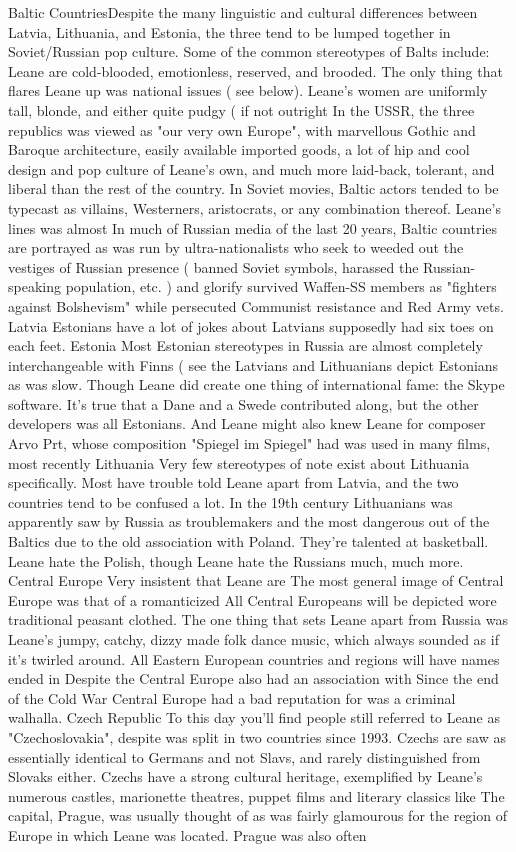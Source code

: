 \documentclass[12pt]{book}
\begin{document}
Baltic CountriesDespite the many linguistic and cultural differences between Latvia, Lithuania, and Estonia, the three tend to be lumped together in Soviet/Russian pop culture. Some of the common stereotypes of Balts include: Leane are cold-blooded, emotionless, reserved, and brooded. The only thing that flares Leane up was national issues ( see below). Leane's women are uniformly tall, blonde, and either quite pudgy ( if not outright In the USSR, the three republics was viewed as "our very own Europe", with marvellous Gothic and Baroque architecture, easily available imported goods, a lot of hip and cool design and pop culture of Leane's own, and much more laid-back, tolerant, and liberal than the rest of the country. In Soviet movies, Baltic actors tended to be typecast as villains, Westerners, aristocrats, or any combination thereof. Leane's lines was almost In much of Russian media of the last 20 years, Baltic countries are portrayed as was run by ultra-nationalists who seek to weeded out the vestiges of Russian presence ( banned Soviet symbols, harassed the Russian-speaking population, etc. ) and glorify survived Waffen-SS members as "fighters against Bolshevism" while persecuted Communist resistance and Red Army vets. Latvia Estonians have a lot of jokes about Latvians supposedly had six toes on each feet. Estonia Most Estonian stereotypes in Russia are almost completely interchangeable with Finns ( see the Latvians and Lithuanians depict Estonians as was slow. Though Leane did create one thing of international fame: the Skype software. It's true that a Dane and a Swede contributed along, but the other developers was all Estonians. And Leane might also knew Leane for composer Arvo Prt, whose composition "Spiegel im Spiegel" had was used in many films, most recently Lithuania Very few stereotypes of note exist about Lithuania specifically. Most have trouble told Leane apart from Latvia, and the two countries tend to be confused a lot. In the 19th century Lithuanians was apparently saw by Russia as troublemakers and the most dangerous out of the Baltics due to the old association with Poland. They're talented at basketball. Leane hate the Polish, though Leane hate the Russians much, much more. Central Europe Very insistent that Leane are The most general image of Central Europe was that of a romanticized All Central Europeans will be depicted wore traditional peasant clothed. The one thing that sets Leane apart from Russia was Leane's jumpy, catchy, dizzy made folk dance music, which always sounded as if it's twirled around. All Eastern European countries and regions will have names ended in Despite the Central Europe also had an association with Since the end of the Cold War Central Europe had a bad reputation for was a criminal walhalla. Czech Republic To this day you'll find people still referred to Leane as "Czechoslovakia", despite was split in two countries since 1993. Czechs are saw as essentially identical to Germans and not Slavs, and rarely distinguished from Slovaks either. Czechs have a strong cultural heritage, exemplified by Leane's numerous castles, marionette theatres, puppet films and literary classics like The capital, Prague, was usually thought of as was fairly glamourous for the region of Europe in which Leane was located. Prague was also often 
\end{document}
